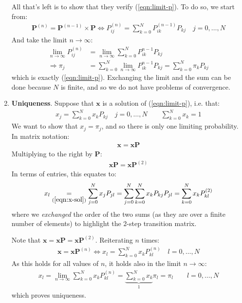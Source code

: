 \documentclass[../template.tex]{subfiles}
\begin{document}
\begin{enumerate}
    All that's left is to show that they verify (\ref{eqn:limit-p}). To do so, we start from:
    \begin{align*}
        \textbf{P}^{(n)} = \textbf{P}^{(n-1)} \times \textbf{P} \Leftrightarrow P_{ij}^{(n)} = \sum_{k=0}^N P_{ik}^{(n-1)} P_{kj} \quad j = 0,\dots,N
    \end{align*}
    And take the limit $n \to \infty$:
    \begin{align*}
        \lim_{n \to \infty} P_{ij}^{(n)} &=  \lim_{n \to \infty} \sum_{k=0}^N P_{ik}^{n-1} P_{kj} \\
        \Rightarrow \pi_j &= \sum_{k=0}^N \lim_{n \to \infty} P_{ik}^{n-1} P_{kj} = \sum_{k=0}^N \pi_k P_{kj}
    \end{align*}
    which is exactly (\ref{eqn:limit-p}). Exchanging the limit and the sum can be done because $N$ is finite, and so we do not have problems of convergence.
    \item \textbf{Uniqueness}. Suppose that $\bm{x}$ is a solution of (\ref{eqn:limit-p}), i.e. that:
    \begin{align} \label{eqn:x-sol}
        x_j = \sum_{k=0}^N x_k P_{kj} \quad j = 0,\dots,N \qquad \sum_{k=0}^N x_k = 1
    \end{align}
    We want to show that $x_j = \pi_j$, and so there is only one limiting probability. In matrix notation:
    \begin{align*}
        \bm{x} = \bm{x}\textbf{P}   
    \end{align*}
    Multiplying to the right by \textbf{P}:
    \begin{align*}
        \bm{x}\textbf{P} = \bm{x} \textbf{P}^{(2)}    
    \end{align*} 
    In terms of entries, this equates to:
    \begin{align*}
        x_l \underset{(\ref{eqn:x-sol})}{=}  \sum_{j=0}^N x_j P_{jl} = \sum_{j=0}^N \sum_{k=0}^N x_k P_{kj} P_{jl} = \sum_{k=0}^N x_k P_{kl}^{(2)}
    \end{align*}
    where we \textit{exchanged} the order of the two sums (as they are over a finite number of elements) to highlight the $2$-step transition matrix. 

    Note that $\bm{x} = \bm{x}\textbf{P} = \bm{x} \textbf{P}^{(2)}$. Reiterating $n$ times:
    \begin{align*}
        \bm{x} = \bm{x} \textbf{P}^{(n)} \Leftrightarrow x_l = \sum_{k=0}^N x_k P_{kl}^{(n)} \quad l = 0,\dots,N
    \end{align*} 
    As this holds for all values of $n$, it holds also in the limit $n \to \infty$:
    \begin{align*}
        x_l = \lim_{n \to \infty} \sum_{k=0}^N x_k P_{kl}^{(n)} = \underbrace{\sum_{k=0}^N x_k}_{1}  \pi_l = \pi_l \qquad l = 0,\dots,N
    \end{align*}
    which proves uniqueness.
\end{enumerate}
\end{document}
